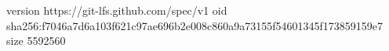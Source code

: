 version https://git-lfs.github.com/spec/v1
oid sha256:f7046a7d6a103f621c97ae696b2e008c860a9a73155f54601345f173859159e7
size 5592560
